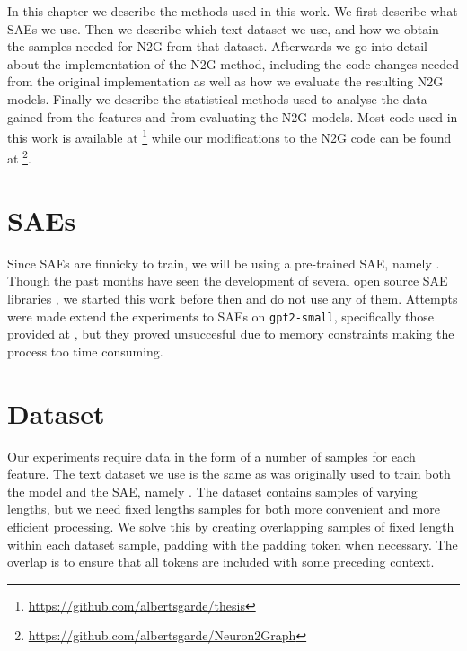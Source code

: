 In this chapter we describe the methods used in this work.
We first describe what SAEs we use.
Then we describe which text dataset we use, and how we obtain the samples needed for N2G from that dataset.
Afterwards we go into detail about the implementation of the N2G method, including the code changes needed from the original implementation as well as how we evaluate the resulting N2G models.
Finally we describe the statistical methods used to analyse the data gained from the features and from evaluating the N2G models.
Most code used in this work is available at \footnote{\url{https://github.com/albertsgarde/thesis}} while our modifications to the N2G code can be found at \footnote{\url{https://github.com/albertsgarde/Neuron2Graph}}.

\section{SAEs}
Since SAEs are finnicky to train, we will be using a pre-trained SAE, namely \textcite{nanda_neelnandasparse_autoencoder_nodate}.
Though the past months have seen the development of several open source SAE libraries \parencite{bloom_jbloomaussaelens_2024}\parencite{cooney_ai-safety-foundationsparse_autoencoder_2024}, we started this work before then and do not use any of them.
Attempts were made extend the experiments to SAEs on \verb|gpt2-small|, specifically those provided at \textcite{wu_openaisparse_autoencoder_2024}, but they proved unsuccesful due to memory constraints making the process too time consuming.

\section{Dataset}
\label{sec:dataset}
Our experiments require data in the form of a number of samples for each feature.
The text dataset we use is the same as was originally used to train both the model and the SAE, namely \textcite{nanda_neelnandac4-code-20k_nodate}.
The dataset contains samples of varying lengths, but we need fixed lengths samples for both more convenient and more efficient processing.
We solve this by creating overlapping samples of fixed length within each dataset sample, padding with the padding token when necessary.
The overlap is to ensure that all tokens are included with some preceding context.

